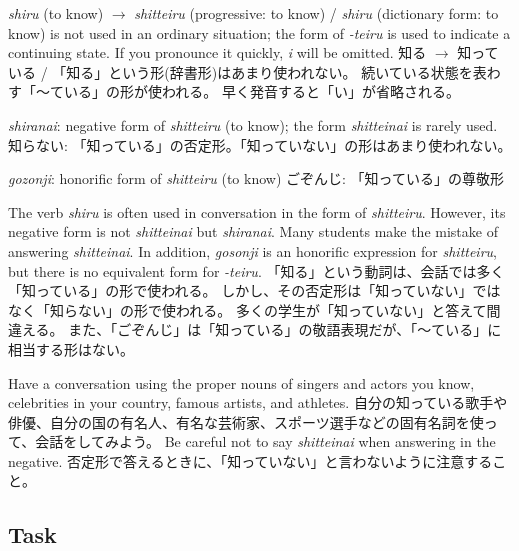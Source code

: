 \documentclass[uplatex,dvipdfmx,b5paper,english,10pt]{jsbook}
\begin{document}
\begin{note}
\ifEnglish
{\it shiru\/} (to know) $\rightarrow$ {\it shitteiru\/} (progressive: to know) /
{\it shiru\/} (dictionary form: to know) is not used in an ordinary situation;
the form of {\it -teiru\/} is used to indicate a continuing state.
If you pronounce it quickly, {\it i\/} will be omitted.
\else
知る $\rightarrow$ 知っている /
「知る」という形(辞書形)はあまり使われない。
続いている状態を表わす「～ている」の形が使われる。
早く発音すると「い」が省略される。%
\fi
\end{note}

\begin{note} %
\ifEnglish
{\it shiranai\/}: negative form of {\it shitteiru\/} (to know);
the form {\it shitteinai\/} is rarely used.
\else
知らない: 「知っている」の否定形。「知っていない」の形はあまり使われない。
\fi
\end{note}

\begin{note}
\ifEnglish
{\it gozonji\/}: honorific form of {\it shitteiru\/} (to know)
\else
ごぞんじ: 「知っている」の尊敬形
\fi
\end{note}

\begin{toianswer}
\ifEnglish
The verb {\it shiru\/} is often used in conversation in the form of {\it shitteiru\/}.
However, its negative form is not {\it shitteinai\/} but {\it shiranai\/}.
Many students make the mistake of answering {\it shitteinai\/}.
In addition, {\it gosonji\/} is an honorific expression for {\it shitteiru\/}, but there is no equivalent form for {\it -teiru\/}.
\else
「知る」という動詞は、会話では多く「知っている」の形で使われる。
しかし、その否定形は「知っていない」ではなく「知らない」の形で使われる。
多くの学生が「知っていない」と答えて間違える。
また、「ごぞんじ」は「知っている」の敬語表現だが、「〜ている」に相当する形はない。
\fi%

\ifEnglish
Have a conversation using the proper nouns of singers and actors you know, celebrities in your country, famous artists, and athletes.
\else
自分の知っている歌手や俳優、自分の国の有名人、有名な芸術家、スポーツ選手などの固有名詞を使って、会話をしてみよう。
\fi
\ifEnglish
Be careful not to say {\it shitteinai\/} when answering in the negative.
\else
否定形で答えるときに、「知っていない」と言わないように注意すること。
\fi
\end{toianswer}


\ifEnglish
\subsection{Task}
\else
\end{document}
